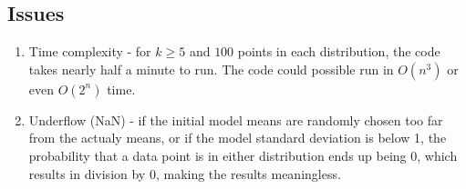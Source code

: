 \documentclass[12pt]{article} %
\begin{document}
\subsection{Issues}
\begin{enumerate}
\item Time complexity - for $k \geq 5$ and $100$ points in each distribution, the code takes nearly half a minute to run. The code could possible run in $O(n^3)$ or even $O(2^n)$ time.
\item Underflow (NaN) - if the initial model means are randomly chosen too far from the actualy means, or if the model standard deviation is below 1, the probability that a data point is in either distribution ends up being 0, which results in division by 0, making the results meaningless.
\end{enumerate}
\end{document}
